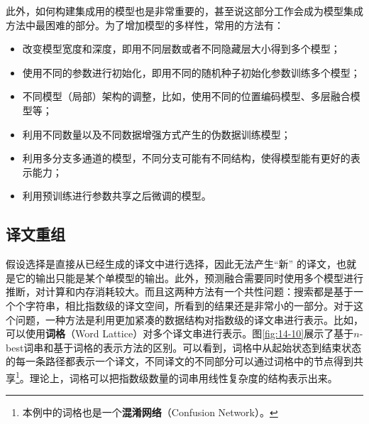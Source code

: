 \parinterval 此外，如何构建集成用的模型也是非常重要的，甚至说这部分工作会成为模型集成方法中最困难的部分。为了增加模型的多样性，常用的方法有：

\begin{itemize}
\vspace{0.5em}
\item 改变模型宽度和深度，即用不同层数或者不同隐藏层大小得到多个模型；
\vspace{0.5em}
\item 使用不同的参数进行初始化，即用不同的随机种子初始化参数训练多个模型；
\vspace{0.5em}
\item 不同模型（局部）架构的调整，比如，使用不同的位置编码模型、多层融合模型等；
\vspace{0.5em}
\item 利用不同数量以及不同数据增强方式产生的伪数据训练模型；
\vspace{0.5em}
\item 利用多分支多通道的模型，不同分支可能有不同结构，使得模型能有更好的表示能力；
\vspace{0.5em}
\item 利用预训练进行参数共享之后微调的模型。
\vspace{0.5em}
\end{itemize}


\subsection{译文重组}

\parinterval 假设选择是直接从已经生成的译文中进行选择，因此无法产生“新” 的译文，也就是它的输出只能是某个单模型的输出。此外，预测融合需要同时使用多个模型进行推断，对计算和内存消耗较大。而且这两种方法有一个共性问题：搜索都是基于一个个字符串，相比指数级的译文空间，所看到的结果还是非常小的一部分。对于这个问题，一种方法是利用更加紧凑的数据结构对指数级的译文串进行表示。比如，可以使用{\small\sffamily\bfseries{词格}}（Word Lattice）对多个译文串进行表示。图\ref{fig:14-10}展示了基于$n$-best词串和基于词格的表示方法的区别。可以看到，词格中从起始状态到结束状态的每一条路径都表示一个译文，不同译文的不同部分可以通过词格中的节点得到共享\footnote{本例中的词格也是一个{\footnotesize\sffamily\bfseries{混淆网络}}（Confusion Network）。}。理论上，词格可以把指数级数量的词串用线性复杂度的结构表示出来。

